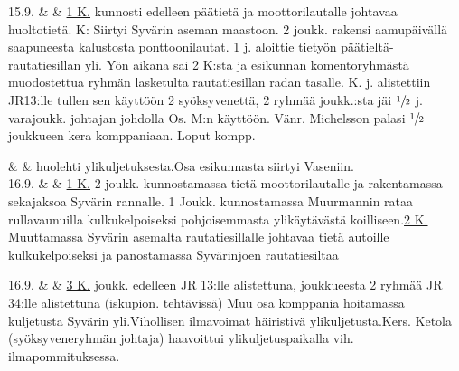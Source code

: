 \documentclass[11pt,a5paper,oneside]{book}
\begin{document}
\taulustop


15.9. & & \underline{1 K.} kunnosti edelleen päätietä ja moottorilautalle johtavaa huoltotietä. \newline{} K: Siirtyi Syvärin aseman maastoon. 2 joukk. rakensi aamupäivällä saapuneesta kalustosta ponttoonilautat. 1 j. aloittie tietyön päätieltä-rautatiesillan yli. Yön aikana sai 2 K:sta ja esikunnan komentoryhmästä muodostettua ryhmän lasketulta rautatiesillan radan tasalle. \newline{} K.  j. alistettiin JR13:lle tullen sen käyttöön 2 syöksyvenettä, 2 ryhmää  joukk.:sta jäi $\sfrac{1}{2}$ j. varajoukk. johtajan johdolla Os. M:n käyttöön. Vänr. Michelsson palasi $\sfrac{1}{2}$ joukkueen kera komppaniaan. Loput kompp. \\

\newpage

& & huolehti ylikuljetuksesta.\newline\newline\newline Osa esikunnasta siirtyi Vaseniin. \newline\newline\newline\newline\newline\newline \\

16.9. & & \underline{1 K.} 2 joukk. kunnostamassa tietä moottorilautalle ja rakentamassa sekajaksoa Syvärin rannalle. 1 Joukk. kunnostamassa Muurmannin rataa rullavaunuilla kulkukelpoiseksi pohjoisemmasta ylikäytävästä koilliseen.\newline\newline \underline{2 K.} Muuttamassa Syvärin asemalta rautatiesillalle johtavaa tietä autoille kulkukelpoiseksi ja panostamassa Syvärinjoen rautatiesiltaa \\

\taulustop


16.9. & & \underline{3 K.}  joukk. edelleen JR 13:lle alistettuna,  joukkueesta 2 ryhmää JR 34:lle alistettuna (iskupion. tehtävissä) Muu osa komppania hoitamassa kuljetusta Syvärin yli.\newline Vihollisen ilmavoimat häiristivä ylikuljetusta.\newline Kers. Ketola (syöksyveneryhmän johtaja) haavoittui ylikuljetuspaikalla vih. ilmapommituksessa. \\
\end{document}
